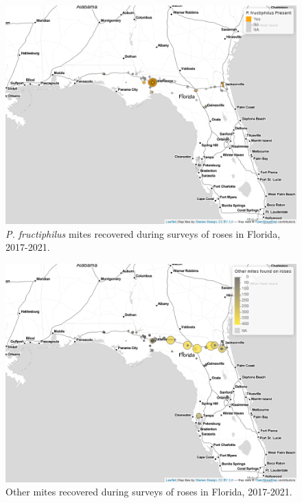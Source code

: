 \documentclass{ufdissertation}[overrideChapters] %
\begin{document}
{\begin{figure}[p]
{\centering \includegraphics[width=1\linewidth]{figure/rrv_survey_map_fl_pf} 

}

\caption[\textit{P. fructiphilus} mites recovered during surveys of roses in Florida]{\textit{P. fructiphilus} mites recovered during surveys of roses in Florida, 2017-2021.}\label{fig:survey-map-1}
\end{figure}
\begin{figure}[p]

{\centering \includegraphics[width=1\linewidth]{figure/rrv_survey_map_fl_other} 

}

\caption[Other mites recovered during surveys of roses in Florida]{Other mites recovered during surveys of roses in Florida, 2017-2021.}\label{fig:survey-map-2}
\end{figure}
\begin{figure}[p]


\end{figure}}
\end{document}
